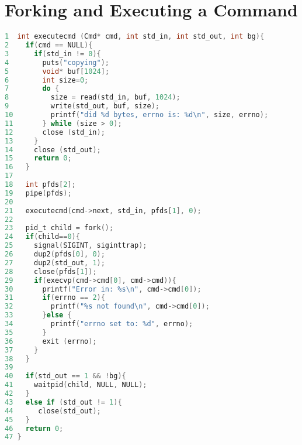 \section{Forking and Executing a Command}
\label{forkexec}
\begin{lstlisting}[language=C]
1  int executecmd (Cmd* cmd, int std_in, int std_out, int bg){
2    if(cmd == NULL){
3      if(std_in != 0){
4        puts("copying");
5        void* buf[1024];
6        int size=0;
7        do {
8          size = read(std_in, buf, 1024);
9          write(std_out, buf, size);
10         printf("did %d bytes, errno is: %d\n", size, errno);
11       } while (size > 0);
12       close (std_in);
13     }
14     close (std_out);
15     return 0;
16   }
17 
18   int pfds[2];
19   pipe(pfds);
20 
21   executecmd(cmd->next, std_in, pfds[1], 0);
22 
23   pid_t child = fork();
24   if(child==0){
25     signal(SIGINT, siginttrap);
26     dup2(pfds[0], 0);
27     dup2(std_out, 1);
28     close(pfds[1]);
29     if(execvp(cmd->cmd[0], cmd->cmd)){
30       printf("Error in: %s\n", cmd->cmd[0]);
31       if(errno == 2){
32         printf("%s not found\n", cmd->cmd[0]);
33       }else {
34         printf("errno set to: %d", errno);
35       }
36       exit (errno);
37     }
38   }
39 
40   if(std_out == 1 && !bg){
41     waitpid(child, NULL, NULL);
42   }
43   else if (std_out != 1){
44      close(std_out);
45   }
46   return 0;
47 }
\end{lstlisting}
